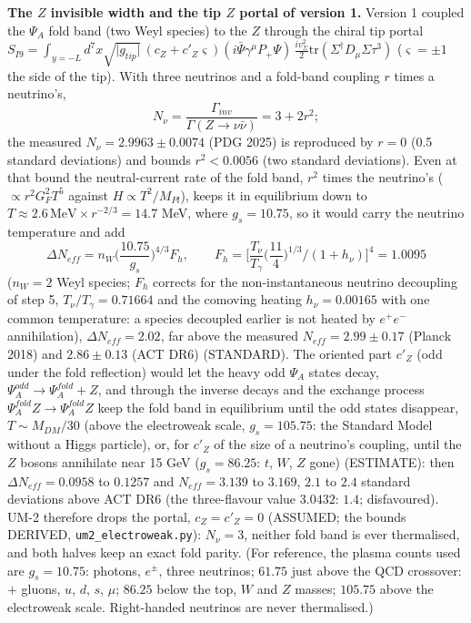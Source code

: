\documentclass[
  10pt,
]{article}
\begin{document}
\textbf{The \(Z\) invisible width and the tip \(Z\) portal of version
1.} Version 1 coupled the \(\Psi_A\) fold band (two Weyl species) to the
\(Z\) through the chiral tip portal
\(S_{I9} = \int_{y=-L}d^7x\sqrt{\lvert g_{tip}\rvert}\,(c_Z + c'_Z\varsigma)(i\bar\Psi\gamma^\mu P_+\Psi)\,\frac{iv_\Sigma^2}{2}\mathrm{tr}(\Sigma^\dagger D_\mu\Sigma\tau^3)\)
(\(\varsigma = \pm1\) the side of the tip). With three neutrinos and a
fold-band coupling \(r\) times a neutrino's,
\[ N_\nu = \frac{\Gamma_{inv}}{\Gamma(Z\to\nu\bar\nu)} = 3 + 2r^2 ;\]
the measured \(N_\nu = 2.9963 \pm 0.0074\) (PDG 2025) is reproduced by
\(r = 0\) (0.5 standard deviations) and bounds \(r^2 < 0.0056\) (two
standard deviations). Even at that bound the neutral-current rate of the
fold band, \(r^2\) times the neutrino's (\(\propto r^2G_F^2T^5\) against
\(H \propto T^2/M_{Pl}\)), keeps it in equilibrium down to
\(T \approx 2.6\,\text{MeV}\times r^{-2/3} = 14.7\) MeV, where
\(g_s = 10.75\), so it would carry the neutrino temperature and add
\[ \Delta N_{eff} = n_W\Big(\frac{10.75}{g_s}\Big)^{4/3}F_h,\qquad F_h = \Big[\frac{T_\nu}{T_\gamma}\Big(\frac{11}{4}\Big)^{1/3}\Big/(1 + h_\nu)\Big]^4 = 1.0095 \]
(\(n_W = 2\) Weyl species; \(F_h\) corrects for the non-instantaneous
neutrino decoupling of step 5, \(T_\nu/T_\gamma = 0.71664\) and the
comoving heating \(h_\nu = 0.00165\) with one common temperature: a
species decoupled earlier is not heated by \(e^+e^-\) annihilation),
\(\Delta N_{eff} = 2.02\), far above the measured
\(N_{eff} = 2.99 \pm 0.17\) (Planck 2018) and \(2.86 \pm 0.13\) (ACT
DR6) (STANDARD). The oriented part \(c'_Z\) (odd under the fold
reflection) would let the heavy odd \(\Psi_A\) states decay,
\(\Psi_A^{odd} \to \Psi_A^{fold} + Z\), and through the inverse decays
and the exchange process \(\Psi_A^{fold}Z \to \Psi_A^{fold}Z\) keep the
fold band in equilibrium until the odd states disappear,
\(T \sim M_{DM}/30\) (above the electroweak scale, \(g_s = 105.75\): the
Standard Model without a Higgs particle), or, for \(c'_Z\) of the size
of a neutrino's coupling, until the \(Z\) bosons annihilate near 15 GeV
(\(g_s = 86.25\): \(t\), \(W\), \(Z\) gone) (ESTIMATE): then
\(\Delta N_{eff} = 0.0958\) to \(0.1257\) and \(N_{eff} = 3.139\) to
\(3.169\), \(2.1\) to \(2.4\) standard deviations above ACT DR6 (the
three-flavour value \(3.0432\): \(1.4\); disfavoured). UM-2 therefore
drops the portal, \(c_Z = c'_Z = 0\) (ASSUMED; the bounds DERIVED,
\texttt{um2\_electroweak.py}): \(N_\nu = 3\), neither fold band is ever
thermalised, and both halves keep an exact fold parity. (For reference,
the plasma counts used are \(g_s = 10.75\): photons, \(e^\pm\), three
neutrinos; \(61.75\) just above the QCD crossover: \(+\) gluons, \(u\),
\(d\), \(s\), \(\mu\); \(86.25\) below the top, \(W\) and \(Z\) masses;
\(105.75\) above the electroweak scale. Right-handed neutrinos are never
thermalised.)
\end{document}
